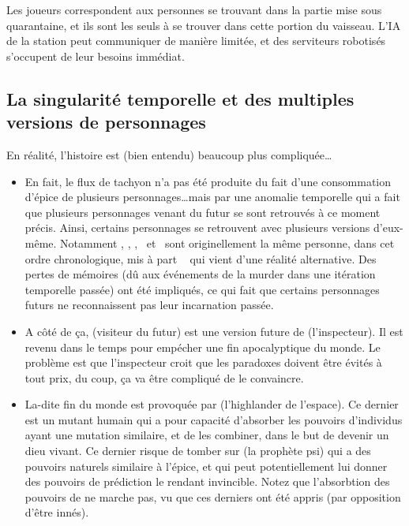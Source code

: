{	\par Les joueurs correspondent aux personnes se trouvant dans la partie mise sous quarantaine, et ils sont les seuls à se trouver dans cette portion du vaisseau. L'IA de la station peut communiquer de manière limitée, et des serviteurs robotisés s'occupent de leur besoins immédiat.
	
	\subsection{La singularité temporelle et des multiples versions de personnages}
	
	\par En réalité, l'histoire est (bien entendu) beaucoup plus compliquée\dots
	\begin{itemize}
		\item En fait, le flux de tachyon n'a pas été produite du fait d'une consommation d'épice de plusieurs personnages\dots mais par une anomalie temporelle qui a fait que plusieurs personnages venant du futur se sont retrouvés à ce moment précis. Ainsi, certains personnages se retrouvent avec plusieurs versions d'eux-même. Notamment \nmPlayerI, \nmPlayerII, \nmPlayerIII, \nmPlayerIV ~et \nmPlayerVI ~sont originellement la même personne, dans cet ordre chronologique, mis à part \nmPlayerVI ~ qui vient d'une réalité alternative. Des pertes de mémoires (dû aux événements de la murder dans une itération temporelle passée) ont été impliqués, ce qui fait que certains personnages futurs ne reconnaissent pas leur incarnation passée.
		
		\item A côté de ça, \nmPlayerV (visiteur du futur) est une version future de \nmPlayerVII (l'inspecteur). Il est revenu dans le temps pour empécher une fin apocalyptique du monde. Le problème est que l'inspecteur croit que les paradoxes doivent être évités à tout prix, du coup, ça va être compliqué de le convaincre.
		
		\item La-dite fin du monde est provoquée par \nmPlayerX (l'highlander de l'espace). Ce dernier est un mutant humain qui a pour capacité d'absorber les pouvoirs d'individus ayant une mutation similaire, et de les combiner, dans le but de devenir un dieu vivant. Ce dernier risque de tomber sur \nmPlayerIX (la prophète psi) qui a des pouvoirs naturels similaire à l'épice, et qui peut potentiellement lui donner des pouvoirs de prédiction le rendant invincible. Notez que l'absorbtion des pouvoirs de \nmPlayerVI ne marche pas, vu que ces derniers ont été appris (par opposition d'être innés).
		

\end{itemize}}
